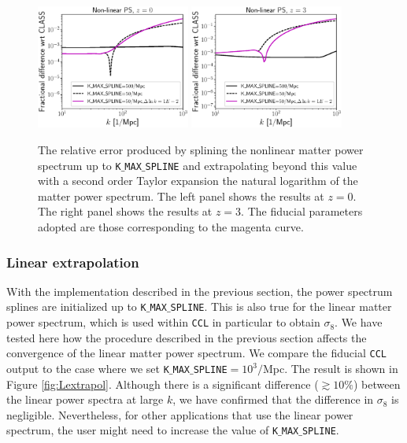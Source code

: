 \documentclass[\docopts]{\docclass}
\begin{document}
\begin{figure}
\centering
\includegraphics[width=0.45\textwidth]{PS_converge_nonlin.eps}
\includegraphics[width=0.45\textwidth]{PS_converge_nonlin_z3.eps}
\caption{The relative error produced by splining the nonlinear matter power spectrum up to {\tt K$\_$MAX$\_$SPLINE} and extrapolating beyond this value with a second order Taylor expansion the natural logarithm of the matter power spectrum. The left panel shows the results at $z=0$. The right panel shows the results at $z=3$. The fiducial parameters adopted are those corresponding to the magenta curve.}
\label{fig:NLextrapol}
\end{figure}

\subsubsection{Linear extrapolation}
\label{sec:Lextrapol}

With the implementation described in the previous section, the power spectrum splines are initialized up to {\tt K$\_$MAX$\_$SPLINE}. This is also true for the linear matter power spectrum, which is used within {\tt CCL} in particular to obtain $\sigma_8$. We have tested here how the procedure described in the previous section affects the convergence of the linear matter power spectrum. We compare the fiducial {\tt CCL} output to the case where we set {\tt K$\_$MAX$\_$SPLINE}$=10^3/$Mpc. The result is shown in Figure \ref{fig:Lextrapol}. Although there is a significant difference ($\gtrsim 10\%$) between the linear power spectra at large $k$, we have confirmed that the difference in $\sigma_8$ is negligible. Nevertheless, for other applications that use the linear power spectrum, the user might need to increase the value of {\tt K$\_$MAX$\_$SPLINE}.
\end{document}
